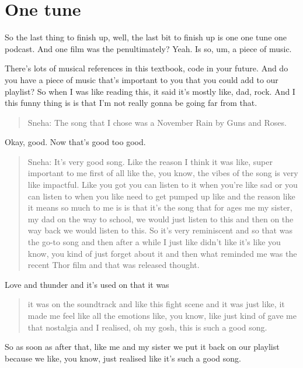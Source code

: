 \documentclass[
]{book}
\begin{document}
\hypertarget{one-tune}{%
\section{One tune}\label{one-tune}}

So the last thing to finish up, well, the last bit to finish up is one one tune one podcast. And one film was the penultimately? Yeah. Is so, um, a piece of music.

There's lots of musical references in this textbook, code in your future. And do you have a piece of music that's important to you that you could add to our playlist? So when I was like reading this, it said it's mostly like, dad, rock. And I this funny thing is is that I'm not really gonna be going far from that.

\begin{quote}
Sneha: The song that I chose was a November Rain by Guns and Roses. \citep{novemberrain}
\end{quote}

Okay, good. Now that's good too good.

\begin{quote}
Sneha: It's very good song. Like the reason I think it was like, super important to me first of all like the, you know, the vibes of the song is very like impactful. Like you got you can listen to it when you're like sad or you can listen to when you like need to get pumped up like and the reason like it means so much to me is is that it's the song that for ages me my sister, my dad on the way to school, we would just listen to this and then on the way back we would listen to this. So it's very reminiscent and so that was the go-to song and then after a while I just like didn't like it's like you know, you kind of just forget about it and then what reminded me was the recent Thor film and that was released thought.
\end{quote}

Love and thunder and it's used on that it was \citep{lovethunder}

\begin{quote}
it was on the soundtrack and like this fight scene and it was just like, it made me feel like all the emotions like, you know, like just kind of gave me that nostalgia and I realised, oh my gosh, this is such a good song.
\end{quote}

So as soon as after that, like me and my sister we put it back on our playlist because we like, you know, just realised like it's such a good song.
\end{document}
